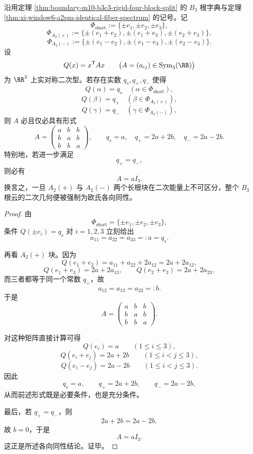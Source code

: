 \begin{theorem}\label{thm:xi-window6-b3-rootcloud-quadratic-isotropy-forcing}
沿用定理 \ref{thm:boundary-m10-b3c3-rigid-four-block-split} 的 \(B_3\) 根字典与定理 \ref{thm:xi-window6-a2pm-identical-fiber-spectrum} 的记号。记
\[
\Phi_{\mathrm{short}}
:=
\{\pm e_1,\pm e_2,\pm e_3\},
\]
\[
\Phi_{A_2(+)}
:=
\{\pm(e_1+e_2),\pm(e_1+e_3),\pm(e_2+e_3)\},
\]
\[
\Phi_{A_2(-)}
:=
\{\pm(e_1-e_2),\pm(e_1-e_3),\pm(e_2-e_3)\}.
\]
设
\[
Q(x)=x^{\mathsf T}Ax
\qquad
\bigl(A=(a_{ij})\in \mathrm{Sym}_3(\RR)\bigr)
\]
为 \(\RR^3\) 上实对称二次型。若存在实数 \(q_s,q_+,q_-\) 使得
\[
Q(\alpha)=q_s\quad (\alpha\in \Phi_{\mathrm{short}}),
\]
\[
Q(\beta)=q_+\quad (\beta\in \Phi_{A_2(+)}),
\]
\[
Q(\gamma)=q_-\quad (\gamma\in \Phi_{A_2(-)}),
\]
则 \(A\) 必且仅必具有形式
\[
\boxed{\;
A=
\begin{pmatrix}
a&b&b\\
b&a&b\\
b&b&a
\end{pmatrix},
\qquad
q_s=a,\quad
q_+=2a+2b,\quad
q_-=2a-2b.\;}
\]
特别地，若进一步满足
\[
q_+=q_-,
\]
则必有
\[
\boxed{\;
A=aI_3.\;}
\]
换言之，一旦 \(A_2(+)\) 与 \(A_2(-)\) 两个长根块在二次能量上不可区分，整个 \(B_3\) 根云的二次几何便被强制为欧氏各向同性。
\end{theorem}
\begin{proof}
由
\[
\Phi_{\mathrm{short}}=\{\pm e_1,\pm e_2,\pm e_3\},
\]
条件 \(Q(\pm e_i)=q_s\) 对 \(i=1,2,3\) 立刻给出
\[
a_{11}=a_{22}=a_{33}=:a=q_s.
\]

再看 \(A_2(+)\) 块。因为
\[
Q(e_1+e_2)=a_{11}+a_{22}+2a_{12}=2a+2a_{12},
\]
\[
Q(e_1+e_3)=2a+2a_{13},
\qquad
Q(e_2+e_3)=2a+2a_{23},
\]
而三者都等于同一个常数 \(q_+\)，故
\[
a_{12}=a_{13}=a_{23}=:b.
\]
于是
\[
A=
\begin{pmatrix}
a&b&b\\
b&a&b\\
b&b&a
\end{pmatrix}.
\]

对这种矩阵直接计算可得
\[
Q(e_i)=a\qquad (1\le i\le 3),
\]
\[
Q(e_i+e_j)=2a+2b\qquad (1\le i<j\le 3),
\]
\[
Q(e_i-e_j)=2a-2b\qquad (1\le i<j\le 3).
\]
因此
\[
q_s=a,\qquad q_+=2a+2b,\qquad q_-=2a-2b,
\]
从而前述形式既是必要条件，也是充分条件。

最后，若 \(q_+=q_-\)，则
\[
2a+2b=2a-2b,
\]
故 \(b=0\)，于是
\[
A=aI_3.
\]
这正是所述各向同性结论。证毕。
\end{proof}

\endinput
